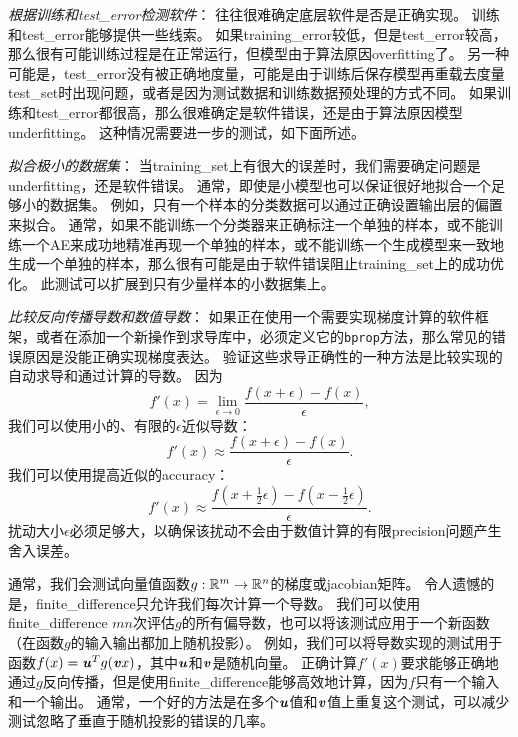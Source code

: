 \emph{根据训练和\gls{test_error}检测软件}：
往往很难确定底层软件是否是正确实现。
训练和\gls{test_error}能够提供一些线索。
如果\gls{training_error}较低，但是\gls{test_error}较高，那么很有可能训练过程是在正常运行，但模型由于算法原因\gls{overfitting}了。
另一种可能是，\gls{test_error}没有被正确地度量，可能是由于训练后保存模型再重载去度量\gls{test_set}时出现问题，或者是因为测试数据和训练数据预处理的方式不同。
如果训练和\gls{test_error}都很高，那么很难确定是软件错误，还是由于算法原因模型\gls{underfitting}。
这种情况需要进一步的测试，如下面所述。


\emph{拟合极小的数据集}：
当\gls{training_set}上有很大的误差时，我们需要确定问题是\gls{underfitting}，还是软件错误。
通常，即使是小模型也可以保证很好地拟合一个足够小的数据集。
例如，只有一个样本的分类数据可以通过正确设置输出层的偏置来拟合。
通常，如果不能训练一个分类器来正确标注一个单独的样本，或不能训练一个\gls{AE}来成功地精准再现一个单独的样本，或不能训练一个生成模型来一致地生成一个单独的样本，那么很有可能是由于软件错误阻止\gls{training_set}上的成功优化。
此测试可以扩展到只有少量样本的小数据集上。


\emph{比较反向传播导数和数值导数}：
如果正在使用一个需要实现梯度计算的软件框架，或者在添加一个新操作到求导库中，必须定义它的\texttt{bprop}方法，那么常见的错误原因是没能正确实现梯度表达。
验证这些求导正确性的一种方法是比较实现的自动求导和通过计算的导数。
因为
\begin{equation}
	f'(x) = \lim_{\epsilon \to 0} \frac{f(x+\epsilon) - f(x)}{\epsilon},
\end{equation}
我们可以使用小的、有限的$\epsilon$近似导数：
\begin{equation}
	f'(x) \approx \frac{f(x+\epsilon) - f(x)}{\epsilon}.
\end{equation}
我们可以使用提高近似的\gls{accuracy}：
\begin{equation}
	f'(x) \approx \frac{ f(x+\frac{1}{2}\epsilon) - f(x-\frac{1}{2}\epsilon) }{\epsilon}.
\end{equation}
扰动大小$\epsilon$必须足够大，以确保该扰动不会由于数值计算的有限\gls{precision}问题产生舍入误差。


通常，我们会测试向量值函数$g:\mathbb{R}^m \to \mathbb{R}^n$的梯度或\gls{jacobian}矩阵。
令人遗憾的是，\gls{finite_difference}只允许我们每次计算一个导数。
我们可以使用\gls{finite_difference} $mn$次评估$g$的所有偏导数，也可以将该测试应用于一个新函数（在函数$g$的输入输出都加上随机投影）。%
例如，我们可以将导数实现的测试用于函数$f(x) = \boldsymbol{\mathit{u}}^T g(\boldsymbol{\mathit{v}} x)$，其中$\boldsymbol{\mathit{u}}$和$\boldsymbol{\mathit{v}}$是随机向量。%
正确计算$f'(x)$要求能够正确地通过$g$反向传播，但是使用\gls{finite_difference}能够高效地计算，因为$f$只有一个输入和一个输出。
通常，一个好的方法是在多个$\boldsymbol{\mathit{u}}$值和$\boldsymbol{\mathit{v}}$值上重复这个测试，可以减少测试忽略了垂直于随机投影的错误的几率。%

